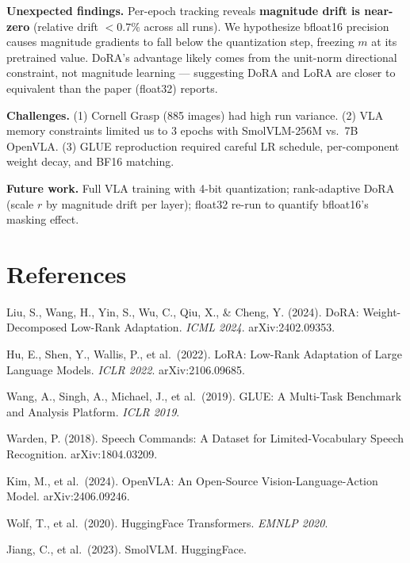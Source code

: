 \documentclass[11pt]{article}
\begin{document}
\textbf{Unexpected findings.} Per-epoch tracking reveals \textbf{magnitude drift is near-zero} (relative drift $<0.7\%$ across all runs). We hypothesize bfloat16 precision causes magnitude gradients to fall below the quantization step, freezing $m$ at its pretrained value. DoRA's advantage likely comes from the unit-norm directional constraint, not magnitude learning — suggesting DoRA and LoRA are closer to equivalent than the paper (float32) reports.

\textbf{Challenges.} (1) Cornell Grasp (885 images) had high run variance. (2) VLA memory constraints limited us to 3 epochs with SmolVLM-256M vs.\ 7B OpenVLA. (3) GLUE reproduction required careful LR schedule, per-component weight decay, and BF16 matching.

\textbf{Future work.} Full VLA training with 4-bit quantization; rank-adaptive DoRA (scale $r$ by magnitude drift per layer); float32 re-run to quantify bfloat16's masking effect.

\section*{References}
{\small
	\begin{enumerate}[leftmargin=*,label={[\arabic*]}]
		\item Liu, S., Wang, H., Yin, S., Wu, C., Qiu, X., \& Cheng, Y. (2024). DoRA: Weight-Decomposed Low-Rank Adaptation. \textit{ICML 2024}. arXiv:2402.09353.
		\item Hu, E., Shen, Y., Wallis, P., et al.\ (2022). LoRA: Low-Rank Adaptation of Large Language Models. \textit{ICLR 2022}. arXiv:2106.09685.
		\item Wang, A., Singh, A., Michael, J., et al.\ (2019). GLUE: A Multi-Task Benchmark and Analysis Platform. \textit{ICLR 2019}.
		\item Warden, P. (2018). Speech Commands: A Dataset for Limited-Vocabulary Speech Recognition. arXiv:1804.03209.
		\item Kim, M., et al.\ (2024). OpenVLA: An Open-Source Vision-Language-Action Model. arXiv:2406.09246.
		\item Wolf, T., et al.\ (2020). HuggingFace Transformers. \textit{EMNLP 2020}.
		\item Jiang, C., et al.\ (2023). SmolVLM. HuggingFace.
	\end{enumerate}
}
\end{document}
